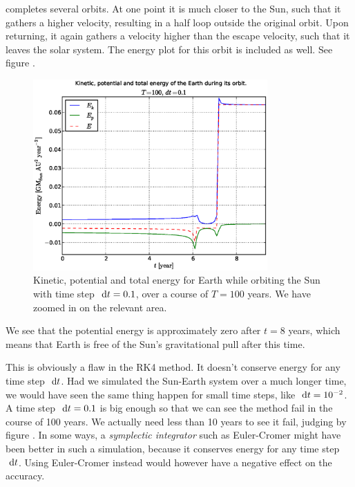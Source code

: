 completes several orbits. At one point it is much closer to the Sun, such
that it gathers a higher velocity, resulting in a half loop outside the original
orbit. Upon returning, it again gathers a velocity higher than the escape
velocity, such that it leaves the solar system. The energy plot for this orbit
is included as well. See figure .
%
\begin{figure}[htpb]
	\centering
	\includegraphics[width=0.8\textwidth]{figures/earth_energy_dt1e-1}
	\caption{Kinetic, potential and total energy for Earth while orbiting the
	Sun with time step $\ \mathrm{d}t = 0.1$, over a course of $T = 100$ years.
	We have zoomed in on the relevant area.}
	\label{fig:energyconstdt0.1}
\end{figure}
%
We see that the potential energy is approximately zero after $t = 8$ years,
which means that Earth is free of the Sun's gravitational pull after this
time.

This is obviously a flaw in the RK4 method. It doesn't conserve energy for any
time step $\ \mathrm{d}t$. Had we simulated the Sun-Earth system over a much longer time,
we would have seen the same thing happen for small time steps, like $\ \mathrm{d}t =
10^{-2}$. 
A time step $\ \mathrm{d}t = 0.1$ is big enough so that we can see the
method fail in the course of 100 years. We actually need less than 10 years
to see it fail, judging by figure . 
In some ways, a \emph{symplectic integrator} such as Euler-Cromer might have 
been better in such a simulation, because it conserves energy for any time step
$\ \mathrm{d}t$. Using Euler-Cromer instead would however have a negative effect on the
accuracy.

